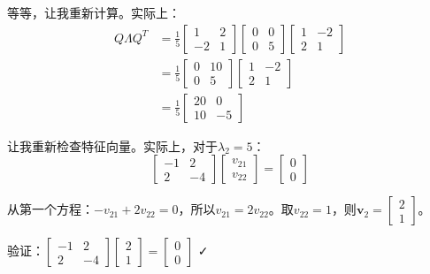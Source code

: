 \documentclass[12pt,a4paper]{article}
\begin{document}
等等，让我重新计算。实际上：
\begin{align}
Q\Lambda Q^T &= \frac{1}{5} \begin{bmatrix} 1 & 2 \\ -2 & 1 \end{bmatrix} \begin{bmatrix} 0 & 0 \\ 0 & 5 \end{bmatrix} \begin{bmatrix} 1 & -2 \\ 2 & 1 \end{bmatrix} \\
&= \frac{1}{5} \begin{bmatrix} 0 & 10 \\ 0 & 5 \end{bmatrix} \begin{bmatrix} 1 & -2 \\ 2 & 1 \end{bmatrix} \\
&= \frac{1}{5} \begin{bmatrix} 20 & 0 \\ 10 & -5 \end{bmatrix}
\end{align}

让我重新检查特征向量。实际上，对于$\lambda_2 = 5$：
\begin{equation}
\begin{bmatrix} -1 & 2 \\ 2 & -4 \end{bmatrix} \begin{bmatrix} v_{21} \\ v_{22} \end{bmatrix} = \begin{bmatrix} 0 \\ 0 \end{bmatrix}
\end{equation}

从第一个方程：$-v_{21} + 2v_{22} = 0$，所以$v_{21} = 2v_{22}$。取$v_{22} = 1$，则$\bm{v}_2 = \begin{bmatrix} 2 \\ 1 \end{bmatrix}$。

验证：$\begin{bmatrix} -1 & 2 \\ 2 & -4 \end{bmatrix} \begin{bmatrix} 2 \\ 1 \end{bmatrix} = \begin{bmatrix} 0 \\ 0 \end{bmatrix}$ ✓
\end{document}
